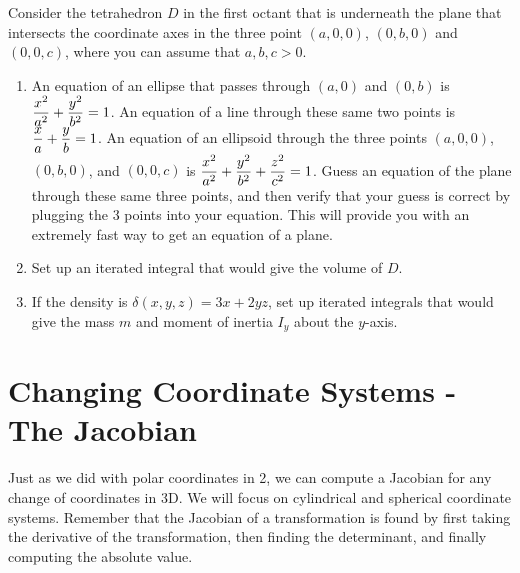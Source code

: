 \begin{problem}
 Consider the tetrahedron $D$ in the first octant that is underneath the plane that intersects the coordinate axes in the three point $(a,0,0)$, $(0,b,0)$ and $(0,0,c)$, where you can assume that $a,b,c>0$.  
 \begin{enumerate}
  \item An equation of an ellipse that passes through $(a,0)$ and $(0,b)$ is $\displaystyle\frac{x^2}{a^2}+\frac{y^2}{b^2}=1$.  An equation of a line through these same two points is $\displaystyle\frac{x}{a}+\frac{y}{b}=1$.  An equation of an ellipsoid through the three points $(a,0,0)$, $(0,b,0)$, and $(0,0,c)$ is $\displaystyle\frac{x^2}{a^2}+\frac{y^2}{b^2}+\frac{z^2}{c^2}=1$. Guess an equation of the plane through these same three points, and then verify that your guess is correct by plugging the 3 points into your equation. This will provide you with an extremely fast way to get an equation of a plane.
  \item Set up an iterated integral that would give the volume of $D$.
  \item If the density is $\delta(x,y,z) = 3x+2yz$, set up iterated integrals that would give the mass $m$ and moment of inertia $I_y$ about the $y$-axis.
 \end{enumerate}
\end{problem}




\section{Changing Coordinate Systems - The Jacobian}

Just as we did with polar coordinates in 2, we can compute a Jacobian for any change of coordinates in 3D.  We will focus on cylindrical and spherical coordinate systems. Remember that the Jacobian of a transformation is found by first taking the derivative of the transformation, then finding the determinant, and finally computing the absolute value. 

